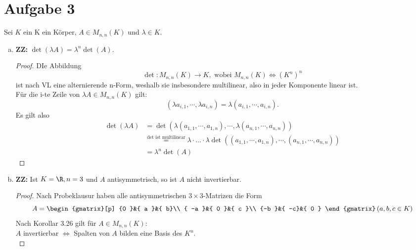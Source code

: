 \documentclass{article}
\begin{document}
\section*{Aufgabe 3}
Sei $K$ ein K ein Körper, $A \in M_{n,n}\left(K\right)$ und $\lambda \in K$.
\begin{enumerate}[(a)]
	\item \textbf{ZZ:} $\operatorname{det}\left(\lambda A\right) = \lambda^n \operatorname{det}\left(A\right).$
	      \begin{proof}
		      DIe Abbildung
		      $$\operatorname{det}: M_{n,n}\left(K\right) \longrightarrow K , \text{ wobei }  M_{n,n}\left(K\right) \Longleftrightarrow \left(K^n\right)^n$$ ist nach VL eine alternierende n-Form, weshalb sie insbesondere multilinear, also in jeder Komponente linear ist.\\
		      Für die i-te Zeile von $\lambda A\in M_{n,n}\left(K\right)$ gilt: $$\left(\lambda a_{i,1}, \cdots , \lambda a_{i,n}\right) = \lambda  \left(a_{i,1}, \cdots , a_{i,n}\right).$$
		      Es gilt also
		      \begin{align*}
			      \operatorname{det} \left(\lambda A\right) & = \operatorname{det}\left(\lambda  \left(a_{1,1}, \cdots , a_{1,n}\right), \cdots , \lambda  \left(a_{n,1}, \cdots , a_{n,n}\right)\right) \\  &\overset{\text{det ist multilinear}}{=} \lambda \cdot ... \cdot \lambda \operatorname{det}\left( \left(a_{1,1}, \cdots , a_{1,n}\right), \cdots , \left(a_{n,1}, \cdots , a_{n,n}\right)\right)\\ &= \lambda^n\operatorname{det}\left( A\right)
		      \end{align*}
	      \end{proof}
	\item  \textbf{ZZ:} Ist $K = \R, n=3$ und $A$ antisymmetrisch, so ist $A$ nicht invertierbar.
	      \begin{proof}
		      Nach Probeklausur haben alle antisymmetrischen $3\times3$-Matrizen die Form
		      $$A =\begin{gmatrix}[p]
				      {0  }&{ a }&{ b}\\
				      { -a }&{ 0 }&{ c }\\
				      {-b }&{ -c}&{ 0 }
			      \end{gmatrix}
			      \left( a,b,c \in K\right)$$
		      Nach Korollar 3.26 gilt für $A  \in M_{n,n}\left(K\right)$:\\
		      $A$ invertierbar $\Longleftrightarrow$ Spalten von $A$ bilden eine Basis des $K^n$.
		      \\

\end{proof}
\end{enumerate}
\end{document}
